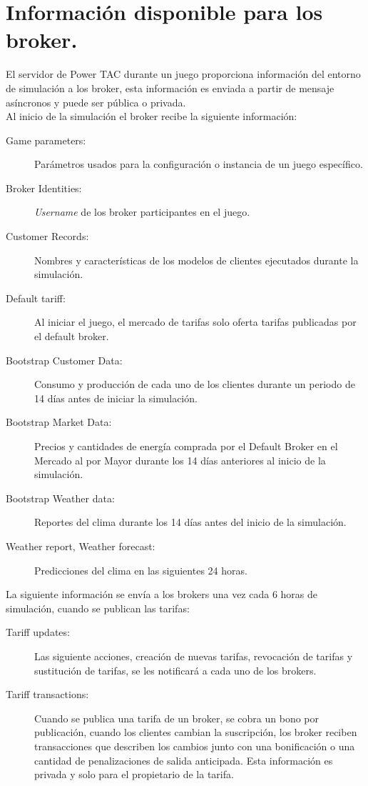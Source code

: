 \section{Información disponible para los broker.}

El servidor de Power TAC durante un juego proporciona información del entorno de simulación a los broker, esta información es enviada a partir de mensaje  asíncronos y puede ser pública o privada.\\

Al inicio de la simulación el broker recibe la siguiente información:
\begin{description}
	\item [Game parameters: ]Parámetros usados para la configuración o instancia de un juego específico.    
	\item [Broker Identities: ]\textit{Username} de los broker participantes en el juego.
	\item [Customer Records: ]Nombres y características de los modelos de clientes ejecutados durante la simulación.
	\item [Default tariff: ]Al iniciar el juego, el mercado de tarifas solo oferta tarifas publicadas por el default broker.
	\item [Bootstrap Customer Data: ]Consumo y producción de cada uno de los clientes durante un periodo de 14 días antes de iniciar la simulación.
	\item [Bootstrap Market Data: ]Precios y cantidades de energía comprada por el Default Broker en el Mercado al por Mayor durante los 14 días anteriores al inicio de la simulación.
	\item [Bootstrap Weather data: ]Reportes del clima durante los 14 días antes del inicio de la simulación.
	\item [Weather report, Weather forecast: ]Predicciones del clima en las siguientes 24 horas.  
\end{description}
La siguiente información se envía a los brokers una vez cada 6 horas de simulación, cuando se publican las tarifas:
\begin{description}
	\item [Tariff updates: ]Las siguiente acciones, creación de nuevas tarifas, revocación de tarifas y sustitución de tarifas, se les notificará a cada uno de los brokers.
	\item [Tariff transactions:] Cuando se publica una tarifa de un broker, se  cobra un bono por publicación, cuando los clientes  cambian la suscripción, los broker reciben transacciones que describen los cambios junto con una bonificación o una cantidad de penalizaciones de salida anticipada. Esta información es privada y solo para el propietario de la tarifa.
\end{description}
